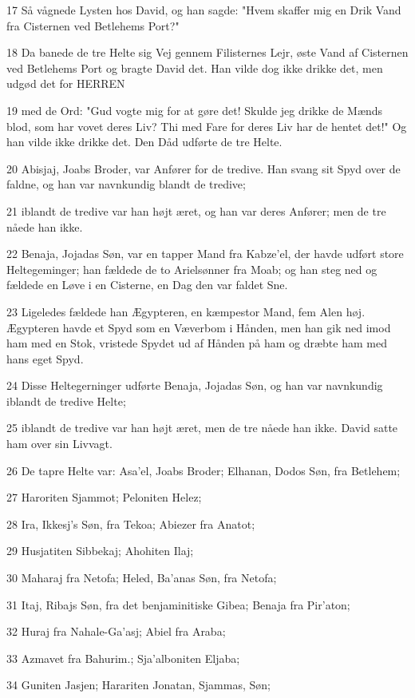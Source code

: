 \par 17 Så vågnede Lysten hos David, og han sagde: "Hvem skaffer mig en Drik Vand fra Cisternen ved Betlehems Port?"
\par 18 Da banede de tre Helte sig Vej gennem Filisternes Lejr, øste Vand af Cisternen ved Betlehems Port og bragte David det. Han vilde dog ikke drikke det, men udgød det for HERREN
\par 19 med de Ord: "Gud vogte mig for at gøre det! Skulde jeg drikke de Mænds blod, som har vovet deres Liv? Thi med Fare for deres Liv har de hentet det!" Og han vilde ikke drikke det. Den Dåd udførte de tre Helte.
\par 20 Abisjaj, Joabs Broder, var Anfører for de tredive. Han svang sit Spyd over de faldne, og han var navnkundig blandt de tredive;
\par 21 iblandt de tredive var han højt æret, og han var deres Anfører; men de tre nåede han ikke.
\par 22 Benaja, Jojadas Søn, var en tapper Mand fra Kabze'el, der havde udført store Heltegeminger; han fældede de to Arielsønner fra Moab; og han steg ned og fældede en Løve i en Cisterne, en Dag den var faldet Sne.
\par 23 Ligeledes fældede han Ægypteren, en kæmpestor Mand, fem Alen høj. Ægypteren havde et Spyd som en Væverbom i Hånden, men han gik ned imod ham med en Stok, vristede Spydet ud af Hånden på ham og dræbte ham med hans eget Spyd.
\par 24 Disse Heltegerninger udførte Benaja, Jojadas Søn, og han var navnkundig iblandt de tredive Helte;
\par 25 iblandt de tredive var han højt æret, men de tre nåede han ikke. David satte ham over sin Livvagt.
\par 26 De tapre Helte var: Asa'el, Joabs Broder; Elhanan, Dodos Søn, fra Betlehem;
\par 27 Haroriten Sjammot; Peloniten Helez;
\par 28 Ira, Ikkesj's Søn, fra Tekoa; Abiezer fra Anatot;
\par 29 Husjatiten Sibbekaj; Ahohiten Ilaj;
\par 30 Maharaj fra Netofa; Heled, Ba'anas Søn, fra Netofa;
\par 31 Itaj, Ribajs Søn, fra det benjaminitiske Gibea; Benaja fra Pir'aton;
\par 32 Huraj fra Nahale-Ga'asj; Abiel fra Araba;
\par 33 Azmavet fra Bahurim.; Sja'alboniten Eljaba;
\par 34 Guniten Jasjen; Harariten Jonatan, Sjammas, Søn;
